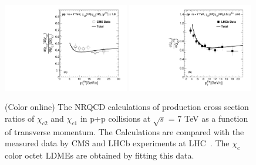 \documentclass[aps,prc,preprint,superscriptaddress,showpacs,showkeys,amsmath]{revtex4-1}
\begin{document}
\begin{figure}
\includegraphics[width=0.49\textwidth]{Fig2a_Chic2Chic1_CMS_Fit.pdf}
\includegraphics[width=0.49\textwidth]{Fig2b_Chic2Chic1_LHCb_Fit.pdf}
\caption{(Color online) The NRQCD calculations of production cross section ratios 
of  $\chi_{c2}$ and $\chi_{c1}$ in p+p collisions at
$\sqrt{s}$ = 7 TeV as a function of transverse momentum. 
The Calculations are compared with the measured data by
CMS and LHCb experiments at LHC~\cite{Chatrchyan:2012ub,Aaij:2013dja}. The $\chi_{c}$
color octet LDMEs are obtained by fitting this data. 
}
\label{Fig:LDMEChicCMS_LHCb}
\end{figure}
\end{document}
